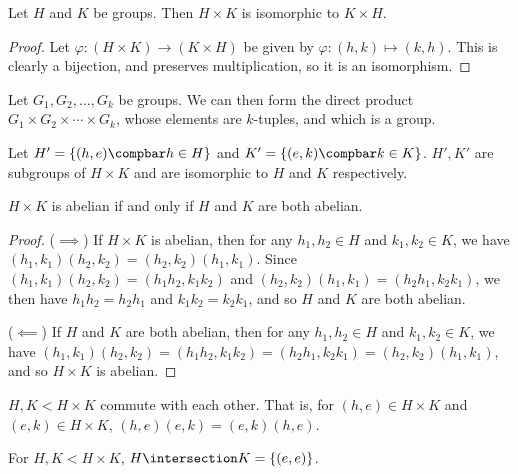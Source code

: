 \documentclass[12pt]{article}
\begin{document}
\begin{prop}
    Let $H$ and $K$ be groups. Then $H \times K$ is isomorphic to $K \times H$.
\end{prop}

\begin{proof}
    Let $\varphi: (H \times K) \to (K \times H)$ be given by $\varphi: (h, k) \mapsto (k, h)$. This is clearly a bijection, and preserves multiplication, so it is an isomorphism.
\end{proof}

\begin{prop}
    Let $G_1, G_2, \ldots, G_k$ be groups. We can then form the direct product $G_1 \times G_2 \times \cdots \times G_k$, whose elements are $k$-tuples, and which is a group.
\end{prop}

\begin{prop}
    Let $H' = \left\{(h, e) \compbar h \in H\right\}$ and $K' = \left\{(e, k) \compbar k \in K\right\}$. $H', K'$ are subgroups of $H \times K$ and are isomorphic to $H$ and $K$ respectively.
\end{prop}

\begin{prop}
    $H \times K$ is abelian if and only if $H$ and $K$ are both abelian.
\end{prop}

\begin{proof}\proofbreak
    ($\implies$) If $H \times K$ is abelian, then for any $h_1,h_2 \in H$ and $k_1,k_2 \in K$, we have $(h_1,k_1)(h_2,k_2) = (h_2,k_2)(h_1,k_1)$. Since $(h_1,k_1)(h_2,k_2) = (h_1h_2,k_1k_2)$ and $(h_2,k_2)(h_1,k_1) = (h_2h_1,k_2k_1)$, we then have $h_1h_2 = h_2h_1$ and $k_1k_2 = k_2k_1$, and so $H$ and $K$ are both abelian.

    ($\impliedby$) If $H$ and $K$ are both abelian, then for any $h_1,h_2 \in H$ and $k_1,k_2 \in K$, we have $(h_1,k_1)(h_2,k_2) = (h_1h_2,k_1k_2) = (h_2h_1,k_2k_1) = (h_2,k_2)(h_1,k_1)$, and so $H \times K$ is abelian.
\end{proof}

\begin{prop}
    $H, K < H \times K$ commute with each other. That is, for $(h, e) \in H \times K$ and $(e, k) \in H \times K$, $(h,e)(e, k) = (e, k)(h,e)$.
\end{prop}

\begin{prop}
    For $H, K < H \times K$, $H \intersection K = \{(e, e)\}$.
\end{prop}
\end{document}
